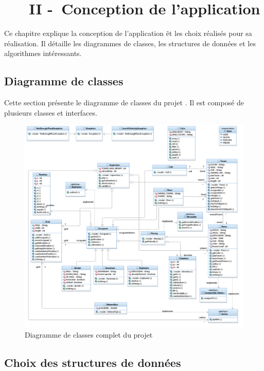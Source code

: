 \chapter[~~~CONCEPTION]{~~~II -~Conception de l’application}%
\label{refDev2}%

Ce chapitre explique la conception de l'application \nom\~et les choix réalisés pour sa réalisation. Il détaille les diagrammes de classes, les structures de données et les algorithmes intéressants.

\section{Diagramme de classes}

Cette section présente le diagramme de classes du projet \nom. Il est composé de plusieurs classes et interfaces.

\begin{figure}[!ht] 
  \centering%
  \includegraphics[width=13.9cm]{assets/pictures/ToursInfernales_Main.png} 
  \caption{Diagramme de classes complet du projet}%
\end{figure}
\newpage

\section{Choix des structures de données}

